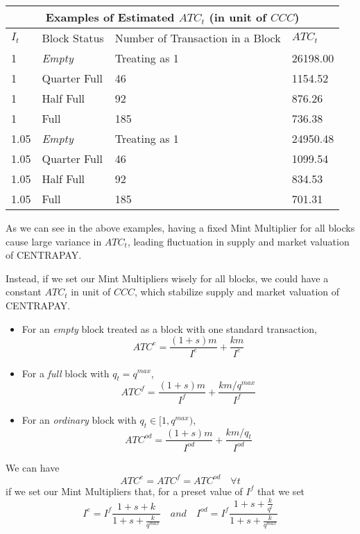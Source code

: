 \documentclass{article}
\begin{document}
\begin{tabular}{ |p{1cm}|p{2.2cm}|p{5.5cm}|p{1.6cm}|  }
 \hline
 \multicolumn{4}{|c|}{Examples of Estimated $ATC_t$ (in unit of $CCC$)} \\
 \hline
$I_t$&Block Status&Number of Transaction in a Block&$ATC_t$\\
 \hline
1   &\textit{Empty}     &Treating as 1      &26198.00 \\
1   &Quarter Full   &46     &1154.52\\
1   &Half Full  &92     &876.26\\
1   &Full   &185    &736.38\\
 \hline
1.05   &\textit{Empty}     &Treating as 1      &24950.48 \\
1.05   &Quarter Full   &46     &1099.54\\
1.05   &Half Full  &92     &834.53\\
1.05   &Full   &185    &701.31\\
\hline
\end{tabular}

As we can see in the above examples, having a fixed Mint Multiplier for all blocks cause large variance in $ATC_t$, leading fluctuation in supply and market valuation of CENTRAPAY. \par
Instead, if we set our Mint Multipliers wisely for all blocks, we could have a constant $ATC_t$ in unit of $CCC$, which stabilize supply and market valuation of CENTRAPAY. \par

\begin{itemize}

\item For an \textit{empty} block treated as a block with one standard transaction, 
$$ATC^e=\frac{(1+s)m}{I^e} + \frac{km}{I^e}$$

\item For a \textit{full} block with $q_t=q^{max}$, 
$$ATC^f=\frac{(1+s)m}{I^f} + \frac{km/q^{max}}{I^f}$$

\item For an \textit{ordinary} block with $q_t \in [1,q^{max})$, 
$$ATC^{od}=\frac{(1+s)m}{I^{od}} + \frac{km/q_t}{I^{od}}$$

\end{itemize}

We can have
$$ATC^e=ATC^f=ATC^{od} \quad \forall t$$
if we set our Mint Multipliers that, for a preset value of $I^f$ that we set 
$$I^e=I^f \frac{1+s+k}{1+s+ \frac{k}{q^{max}}} \quad and \quad
I^{od}=I^f \frac{1+s+ \frac{k}{q^t}}{1+s+ \frac{k}{q^{max}}} $$
\end{document}

